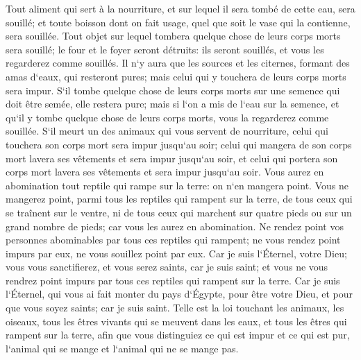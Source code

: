 \verse Tout aliment qui sert à la nourriture, et sur lequel il sera tombé de cette eau, sera souillé; et toute boisson dont on fait usage, quel que soit le vase qui la contienne, sera souillée. 
\verse Tout objet sur lequel tombera quelque chose de leurs corps morts sera souillé; le four et le foyer seront détruits: ils seront souillés, et vous les regarderez comme souillés. 
\verse Il n`y aura que les sources et les citernes, formant des amas d`eaux, qui resteront pures; mais celui qui y touchera de leurs corps morts sera impur. 
\verse S`il tombe quelque chose de leurs corps morts sur une semence qui doit être semée, elle restera pure; 
\verse mais si l`on a mis de l`eau sur la semence, et qu`il y tombe quelque chose de leurs corps morts, vous la regarderez comme souillée. 
\verse S`il meurt un des animaux qui vous servent de nourriture, celui qui touchera son corps mort sera impur jusqu`au soir; 
\verse celui qui mangera de son corps mort lavera ses vêtements et sera impur jusqu`au soir, et celui qui portera son corps mort lavera ses vêtements et sera impur jusqu`au soir. 
\verse Vous aurez en abomination tout reptile qui rampe sur la terre: on n`en mangera point. 
\verse Vous ne mangerez point, parmi tous les reptiles qui rampent sur la terre, de tous ceux qui se traînent sur le ventre, ni de tous ceux qui marchent sur quatre pieds ou sur un grand nombre de pieds; car vous les aurez en abomination. 
\verse Ne rendez point vos personnes abominables par tous ces reptiles qui rampent; ne vous rendez point impurs par eux, ne vous souillez point par eux. 
\verse Car je suis l`Éternel, votre Dieu; vous vous sanctifierez, et vous serez saints, car je suis saint; et vous ne vous rendrez point impurs par tous ces reptiles qui rampent sur la terre. 
\verse Car je suis l`Éternel, qui vous ai fait monter du pays d`Égypte, pour être votre Dieu, et pour que vous soyez saints; car je suis saint. 
\verse Telle est la loi touchant les animaux, les oiseaux, tous les êtres vivants qui se meuvent dans les eaux, et tous les êtres qui rampent sur la terre, 
\verse afin que vous distinguiez ce qui est impur et ce qui est pur, l`animal qui se mange et l`animal qui ne se mange pas. 

